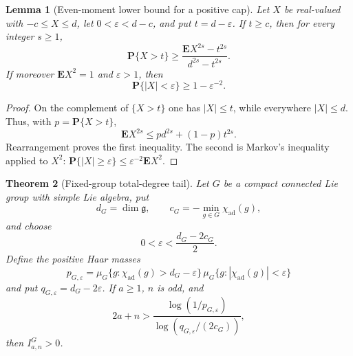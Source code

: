 \documentclass[11pt,reqno]{amsart}
\theoremstyle{plain}
\newtheorem{theorem}{Theorem}[section]
\newtheorem{lemma}[theorem]{Lemma}
\theoremstyle{definition}
\newcommand{\chiad}{\chi_{\mathrm{ad}}}
\begin{document}
\begin{lemma}[Even-moment lower bound for a positive cap]
\label{lem:moment-cap-lower-bound}
Let $X$ be real-valued with $-c\leq X\leq d$, let
$0<\varepsilon<d-c$, and put $t=d-\varepsilon$.  If $t\geq c$, then for
every integer $s\geq1$,
\[
 \mathbf P\{X>t\}
 \geq
 \frac{\mathbf E X^{2s}-t^{2s}}{d^{2s}-t^{2s}}.
\]
If moreover $\mathbf E X^2=1$ and $\varepsilon>1$, then
\[
 \mathbf P\{|X|<\varepsilon\}\geq1-\varepsilon^{-2}.
\]
\end{lemma}

\begin{proof}
On the complement of $\{X>t\}$ one has $|X|\leq t$, while everywhere
$|X|\leq d$.  Thus, with $p=\mathbf P\{X>t\}$,
\[
 \mathbf E X^{2s}\leq p d^{2s}+(1-p)t^{2s}.
\]
Rearrangement proves the first inequality.  The second is Markov's
inequality applied to $X^2$:
$\mathbf P\{|X|\geq\varepsilon\}\leq\varepsilon^{-2}\mathbf E X^2$.
\end{proof}

\begin{theorem}[Fixed-group total-degree tail]
\label{thm:fixed-group-total-degree-tail}
Let $G$ be a compact connected Lie group with simple Lie algebra, put
\[
 d_G=\dim\mathfrak g,
 \qquad
 c_G=-\min_{g\in G}\chiad(g),
\]
and choose
\[
 0<\varepsilon<\frac{d_G-2c_G}{2}.
\]
Define the positive Haar masses
\[
 p_{G,\varepsilon}
 =\mu_G\{g:\chiad(g)>d_G-\varepsilon\}\,
  \mu_G\{g:|\chiad(g)|<\varepsilon\}
\]
and put $q_{G,\varepsilon}=d_G-2\varepsilon$.  If $a\geq1$, $n$ is odd,
and
\[
 2a+n>
 \frac{\log(1/p_{G,\varepsilon})}
      {\log(q_{G,\varepsilon}/(2c_G))},
\]
then $I^G_{a,n}>0$.
\end{theorem}
\end{document}
